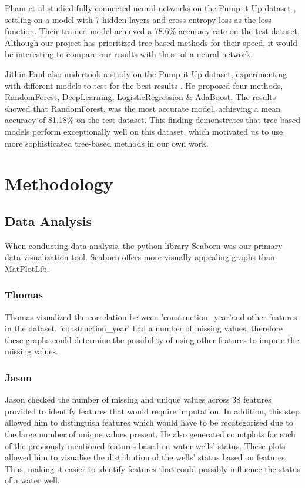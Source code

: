 \documentclass[conference]{IEEEtran}
\begin{document}
Pham et al studied fully connected neural networks on the Pump it Up dataset \cite{Pham_2018}, settling on a model with 7 hidden layers and cross-entropy loss as the loss function. Their trained model achieved a 78.6\% accuracy rate on the test dataset. Although our project has prioritized tree-based methods for their speed, it would be interesting to compare our results with those of a neural network.

Jithin Paul also undertook a study on the Pump it Up dataset, experimenting with different models to test for the best results \cite{Paul_2023}. He proposed four methods, RandomForest, DeepLearning, LogisticRegression \& AdaBoost. The results showed that RandomForest, was the most accurate model, achieving a mean accuracy of 81.18\% on the test dataset. This finding demonstrates that tree-based models perform exceptionally well on this dataset, which motivated us to use more sophisticated tree-based methods in our own work.

\section{Methodology} \label{ref:method}

\subsection{Data Analysis}


When conducting data analysis, the python library Seaborn \cite{seaborn} was our primary data visualization tool. Seaborn offers more visually appealing graphs than MatPlotLib.

\subsubsection{Thomas}

Thomas visualized the correlation between 'construction\_year'and other features in the dataset. 'construction\_year' had a number of missing values, therefore these graphs could determine the possibility of using other features to impute the missing values.

\subsubsection{Jason}

Jason checked the number of missing and unique values across 38 features provided to identify features that would require imputation. In addition, this step allowed him to distinguish features which would have to be recategorised due to the large number of unique values present. He also generated countplots for each of the previously mentioned features based on water wells' status. These plots allowed him to visualise the distribution of the wells' status based on features. Thus, making it easier to identify features that could possibly influence the status of a water well.
\end{document}
